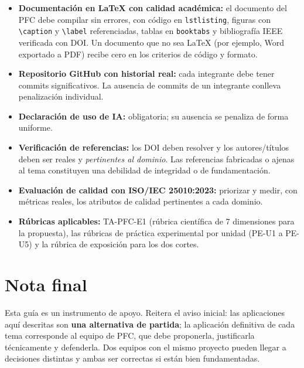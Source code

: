 \documentclass[11pt]{article}
\begin{document}
\begin{itemize}[leftmargin=1.3em,itemsep=3pt]
\item \textbf{Documentación en LaTeX con calidad académica:} el documento del PFC debe compilar sin errores, con código en \texttt{lstlisting}, figuras con \texttt{\textbackslash caption} y \texttt{\textbackslash label} referenciadas, tablas en \texttt{booktabs} y bibliografía IEEE verificada con DOI. Un documento que no sea LaTeX (por ejemplo, Word exportado a PDF) recibe cero en los criterios de código y formato.
\item \textbf{Repositorio GitHub con historial real:} cada integrante debe tener commits significativos. La ausencia de commits de un integrante conlleva penalización individual.
\item \textbf{Declaración de uso de IA:} obligatoria; su ausencia se penaliza de forma uniforme.
\item \textbf{Verificación de referencias:} los DOI deben resolver y los autores/títulos deben ser reales y \emph{pertinentes al dominio}. Las referencias fabricadas o ajenas al tema constituyen una debilidad de integridad o de fundamentación.
\item \textbf{Evaluación de calidad con ISO/IEC 25010:2023:} priorizar y medir, con métricas reales, los atributos de calidad pertinentes a cada dominio.
\item \textbf{Rúbricas aplicables:} TA-PFC-E1 (rúbrica científica de 7 dimensiones para la propuesta), las rúbricas de práctica experimental por unidad (PE-U1 a PE-U5) y la rúbrica de exposición para los dos cortes.
\end{itemize}

\section{Nota final}
Esta guía es un instrumento de apoyo. Reitera el aviso inicial: las aplicaciones aquí descritas son
\textbf{una alternativa de partida}; la aplicación definitiva de cada tema corresponde al equipo de PFC, que
debe proponerla, justificarla técnicamente y defenderla. Dos equipos con el mismo proyecto pueden llegar a
decisiones distintas y ambas ser correctas si están bien fundamentadas.
\end{document}
